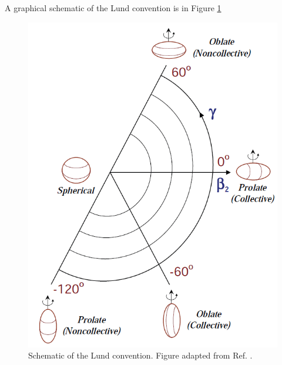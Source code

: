 A graphical schematic of the Lund convention is in Figure \ref{fig:chp2-lund}
\begin{figure}[t!]
\label{fig:chp2-lund}
\centerline{\includegraphics[height=0.25\textheight]{./img/c2/lundconv.png}}
	\caption{Schematic of the Lund convention. Figure adapted from Ref. \cite{danielDissertation}.}
\end{figure}
